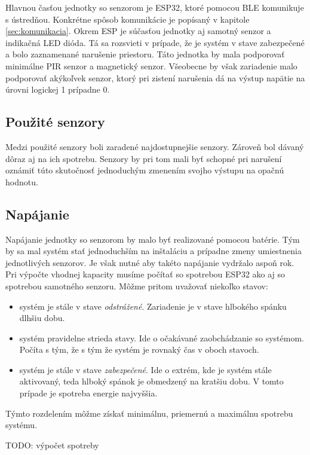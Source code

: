 Hlavnou časťou jednotky so senzorom je ESP32, ktoré pomocou BLE komunikuje s ústredňou. Konkrétne spôsob komunikácie je popísaný v kapitole \ref{sec:komunikacia}. Okrem ESP je súčasťou jednotky aj samotný senzor a indikačná LED dióda. Tá sa rozsvieti v prípade, že je systém v stave zabezpečené a bolo zaznamenané narušenie priestoru. Táto jednotka by mala podporovať minimálne PIR senzor a magnetický senzor. Všeobecne by však zariadenie malo podporovať akýkoľvek senzor, ktorý pri zistení narušenia dá na výstup napätie na úrovni logickej 1 prípadne 0.

\subsection{Použité senzory}

Medzi použité senzory boli zaradené najdostupnejšie senzory. Zároveň bol dávaný dôraz aj na ich spotrebu. Senzory by pri tom mali byť schopné pri narušení oznámiť túto skutočnosť jednoduchým zmenením svojho výstupu na opačnú hodnotu.



\subsection{Napájanie}

Napájanie jednotky so senzorom by malo byť realizované pomocou batérie. Tým by sa mal systém stať jednoduchším na inštaláciu a prípadne zmeny umiestnenia jednotlivých senzorov. Je však nutné aby takéto napájanie vydržalo aspoň rok. Pri výpočte vhodnej kapacity musíme počítať so spotrebou ESP32 ako aj so spotrebou samotného senzoru. Môžme pritom uvažovať niekoľko stavov:
\begin{itemize}
    \item systém je stále v stave \textit{odstrážené}. Zariadenie je v stave hlbokého spánku dlhšiu dobu.
    \item systém pravidelne strieda stavy. Ide o očakávané zaobchádzanie so systémom. Počíta s tým, že s tým že systém je rovnaký čas v oboch stavoch.
    \item systém je stále v stave \textit{zabezpečené}. Ide o extrém, kde je systém stále aktivovaný, teda hlboký spánok je obmedzený na kratšiu dobu. V tomto prípade je spotreba energie najvyššia.
\end{itemize}

Týmto rozdelením môžme získať minimálnu, priemernú a maximálnu spotrebu systému. 

TODO: výpočet spotreby

